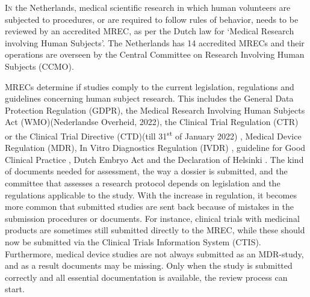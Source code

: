 \documentclass[authordate, empirical]{jote-new-article}
\author[1]{\mbox{Sigrid Heinsbroek\orcid{0000-0003-0971-8599}}}
\affil[1]{METC NedMec}
\author[2]{\mbox{Vincent Bontrop\orcid{0000-0003-4009-0939}}}
\affil[2]{METC NedMec}
\author[3]{\mbox{Rutger P. Chorus}}
\affil[3]{METC NedMec}
\author[4]{\mbox{C. Michel Zwaan\orcid{0000-0001-6892-8268}}}
\affil[4]{METC NedMec}
\begin{document}
\begin{frontmatter}
  \maketitle
  \begin{abstract}
    \printabstracttext
  \end{abstract}
\end{frontmatter}



	\lettrine{I}{n} the Netherlands, medical scientific research in which human volunteers are subjected to procedures, or are required to follow rules of behavior, needs to be reviewed by an accredited MREC, as per the Dutch law for ‘Medical Research involving Human Subjects'. The Netherlands has 14 accredited MRECs and their operations are overseen by the Central Committee on Research Involving Human Subjects (CCMO).



	MRECs determine if studies comply to the current legislation, regulations and guidelines concerning human subject research. This includes the General Data Protection Regulation (GDPR)\parencites{TheEuropeanParliament2016}, the Medical Research Involving Human Subjects Act (WMO)(Nederlandse Overheid, 2022), the Clinical Trial Regulation (CTR) \parencites{TheEuropeanParliament2014} or the Clinical Trial Directive (CTD)(till 31\textsuperscript{st} of January 2022)  \parencites{TheEuropeanParliament2001}, Medical Device Regulation (MDR)\parencites{TheEuropeanParliament2021}, In Vitro Diagnostics Regulation (IVDR) \parencites{TheEuropeanParliament2017}, guideline for Good Clinical Practice \parencites{EuropeanMedicinesAgency2016}, Dutch Embryo Act \parencites{NederlandseOverheid2021} and the Declaration of Helsinki \parencites{TheWorldMedicalAssociation2013}. The kind of documents needed for assessment, the way a dossier is submitted, and the committee that assesses a research protocol depends on legislation and the regulations applicable to the study. With the increase in regulation, it becomes more common that submitted studies are sent back because of mistakes in the submission procedures or documents. For instance, clinical trials with medicinal products are sometimes still submitted directly to the MREC, while these should now be submitted via the Clinical Trials Information System (CTIS). Furthermore, medical device studies are not always submitted as an MDR-study, and as a result documents may be missing. Only when the study is submitted correctly and all essential documentation is available, the review process can start.
\end{document}
